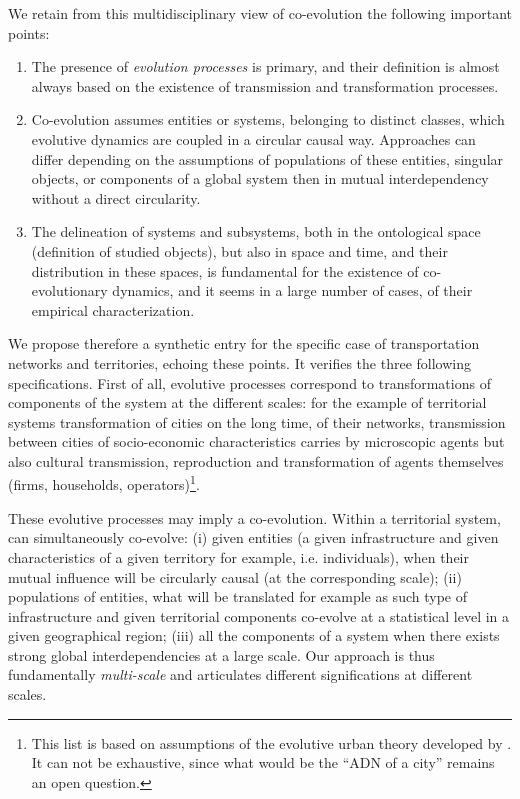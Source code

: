 \documentclass[letterpaper]{article}
\begin{document}
We retain from this multidisciplinary view of co-evolution the following important points:

\begin{enumerate}
	\item The presence of \emph{evolution processes} is primary, and their definition is almost always based on the existence of transmission and transformation processes.
	\item Co-evolution assumes entities or systems, belonging to distinct classes, which evolutive dynamics are coupled in a circular causal way. Approaches can differ depending on the assumptions of populations of these entities, singular objects, or components of a global system then in mutual interdependency without a direct circularity.
	\item The delineation of systems and subsystems, both in the ontological space (definition of studied objects), but also in space and time, and their distribution in these spaces, is fundamental for the existence of co-evolutionary dynamics, and it seems in a large number of cases, of their empirical characterization.
\end{enumerate}



We propose therefore a synthetic entry for the specific case of transportation networks and territories, echoing these points. It verifies the three following specifications. First of all, evolutive processes correspond to transformations of components of the system at the different scales: for the example of territorial systems transformation of cities on the long time, of their networks, transmission between cities of socio-economic characteristics carries by microscopic agents but also cultural transmission, reproduction and transformation of agents themselves (firms, households, operators)\footnote{This list is based on assumptions of the evolutive urban theory developed by \cite{pumain2008socio}. It can not be exhaustive, since what would be the ``ADN of a city'' remains an open question.}.

These evolutive processes may imply a co-evolution. Within a territorial system, can simultaneously co-evolve: (i) given entities (a given infrastructure and given characteristics of a given territory for example, i.e. individuals), when their mutual influence will be circularly causal (at the corresponding scale); (ii) populations of entities, what will be translated for example as such type of infrastructure and given territorial components co-evolve at a statistical level in a given geographical region; (iii) all the components of a system when there exists strong global interdependencies at a large scale. Our approach is thus fundamentally \emph{multi-scale} and articulates different significations at different scales.
\end{document}
